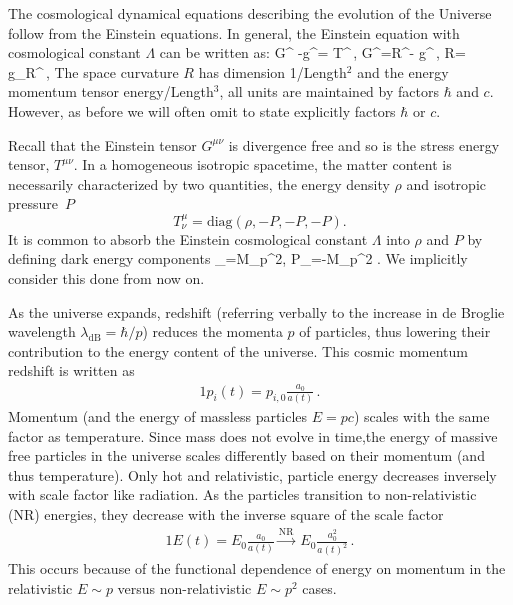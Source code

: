The cosmological dynamical equations describing the evolution of the Universe follow from the Einstein equations. In general, the Einstein equation with cosmological constant $\Lambda$ can be written as:
\beqn\label{Einstine}
G^{\mu\nu} -\Lambda g^{\mu\nu}= T^{\mu\nu}\,, \quad G^{\mu\nu}=R^{\mu\nu}- g^{\mu\nu}\,,
\quad R= g_{\mu\nu}R^{\mu\nu}\,,
\eeqn
The space curvature $R$ has dimension 1/Length$^2$ and the energy momentum tensor energy/Length$^3$, all units are maintained by factors $\hbar$ and $c$. However, as before we will often omit to state explicitly factors $\hbar$ or $c$.

Recall that the Einstein tensor $G^{\mu\nu}$ is divergence free and so is the stress energy tensor, $T^{\mu\nu}$. In a homogeneous isotropic spacetime, the matter content is necessarily characterized by two quantities, the energy density $\rho$ and isotropic pressure~$P$
\begin{equation}
 T^\mu_\nu =\mathrm{diag}(\rho, -P, -P, -P).
\end{equation}
 It is common to absorb the Einstein cosmological constant $\Lambda$ into $\rho$ and $P$ by defining dark energy components
\beqn\label{EpsLam}
\rho_\Lambda=M_p^2\Lambda, \qquad P_\Lambda=-M_p^2 \Lambda.
\eeqn
We implicitly consider this done from now on. 

As the universe expands, redshift (referring verbally to the increase in de Broglie wavelength $\lambda_\mathrm{dB}=\hbar /p$) reduces the momenta $p$ of particles, thus lowering their contribution to the energy content of the universe. This cosmic momentum redshift is written as
\begin{alignat}{1}
 \label{Redshift} p_{i}(t) = p_{i,0}\frac{a_{0}}{a(t)}\,.
\end{alignat}
Momentum (and the energy of massless particles $E=pc$) scales with the same factor as temperature. Since mass does not evolve in time,the energy of massive free particles in the universe scales differently based on their momentum (and thus temperature). Only hot and relativistic, particle energy decreases inversely with scale factor like radiation. As the particles transition to non-relativistic (NR) energies, they decrease with the inverse square of the scale factor
\begin{alignat}{1}
 \label{EScale} E(t) = E_{0}\frac{a_{0}}{a(t)}\xrightarrow{\mathrm{NR}}\ E_{0}\frac{a_{0}^{2}}{a(t)^{2}}\,.
\end{alignat}
This occurs because of the functional dependence of energy on momentum in the relativistic $E\sim p$ versus non-relativistic $E\sim p^{2}$ cases.

